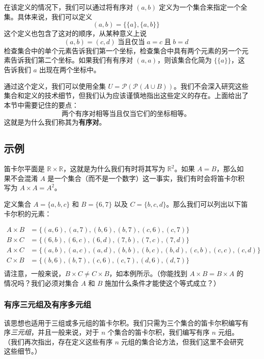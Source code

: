 在该定义的情况下，我们可以通过将有序对 $(a, b)$ 定义为一个集合来指定一个全集。具体来说，我们可以定义
\[(a, b) = \{ \{a\}, \{a, b\} \}\]
这个定义也包含了这对的顺序，从某种意义上说
\[(a, b) = (c, d) \;\text{当且仅当}\; a = c \;\text{且}\; b = d\]
检查集合中的单个元素告诉我们第一个坐标，检查集合中具有两个元素的另一个元素告诉我们第二个坐标。如果我们有有序对 $(a, a)$，则该集合化简为 $\{\{a\}\}$，这告诉我们 $a$ 出现在两个坐标中。

通过这个定义，我们可以使用全集 $U = \mathcal{P}(\mathcal{P}(A \cup B))$。我们不会深入研究这些集合和定义的技术细节，但我们认为应该谨慎地指出这些定义的存在。上面给出了本节中需要记住的要点：
\[\text{两个有序对相等当且仅当它们的坐标相等。}\]
这就是为什么我们称其为\textbf{有序对}。

\subsection{示例}

笛卡尔平面是 $\mathbb{R} \times \mathbb{R}$，这就是为什么我们有时将其写为 $\mathbb{R}^2$。如果 $A = B$，那么如果不会混淆 $A$ 是一个集合（而不是一个数字）这一事实，我们有时会将笛卡尔积写为 $A \times A = A^2$。\\

\begin{example}
    定义集合 $A = \{a, b, c\}$ 和 $B = \{6, 7\}$ 以及 $C = \{b, c, d\}$。那么我们可以列出以下笛卡尔积的元素：

    \begin{align*}
        A \times B &= \{(a, 6),(a, 7),(b, 6),(b, 7),(c, 6),(c, 7)\} \\
        B \times C &= \{(6, b),(6, c),(6, d),(7, b),(7, c),(7, d)\} \\
        A \times C &= \{(a, b),(a, c),(a, d),(b, b),(b, c),(b, d),(c, b),(c, c),(c, d)\} \\
        C \times B &= \{(b, 6),(b, 7),(c, 6),(c, 7),(d, 6),(d, 7)\}\\
    \end{align*}
    请注意，一般来说，$B \times C \ne C \times B$，如本例所示。（你能找到 $A \times B = B \times A$ 的情况吗？我们必须对集合 $A$ 和 $B$ 施加什么条件才能使这个等式成立？）
\end{example}

\subsubsection*{有序三元组及有序多元组}

该思想也适用于三组或多元组的笛卡尔积。我们只需为三个集合的笛卡尔积编写有序\emph{三元组}，并且一般来说，对于 $n$ 个集合的笛卡尔积，我们编写有序 $n$ 元组。（我们再次指出，存在定义这些有序 $n$ 元组的集合论方法，但我们这里不会研究这些细节。）\\

